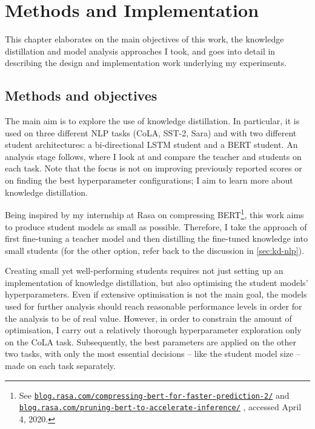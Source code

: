 \documentclass[bsc,frontabs,singlespacing,parskip,deptreport]{infthesis}
\newcommand\rurl[1]{%
  \href{https://#1}{\nolinkurl{#1}}%
}
\begin{document}
\chapter{Methods and Implementation}{
  \label{chap:methods-implementation}

  This chapter elaborates on the main objectives of this work, the knowledge distillation and model analysis approaches I took, and goes into detail in describing the design and implementation work underlying my experiments.

  \section{Methods and objectives}{
    \label{sec:methods}
    The main aim is to explore the use of knowledge distillation. In particular, it is used on three different NLP tasks (CoLA, SST-2, Sara) and with two different student architectures: a bi-directional LSTM student and a BERT student. An analysis stage follows, where I look at and compare the teacher and students on each task. 
    Note that the focus is not on improving previously reported scores or on finding the best hyperparameter configurations; I aim to learn more about knowledge distillation.

    Being inspired by my internship at Rasa on compressing BERT\footnote{See \rurl{blog.rasa.com/compressing-bert-for-faster-prediction-2/} and \rurl{blog.rasa.com/pruning-bert-to-accelerate-inference/}, accessed April 4, 2020.}, this work aims to produce student models as small as possible.
    Therefore, I take the approach of first fine-tuning a teacher model and then distilling the fine-tuned knowledge into small students (for the other option, refer back to the discussion in \autoref{sec:kd-nlp}).

    Creating small yet well-performing students requires not just setting up an implementation of knowledge distillation, but also optimising the student models' hyperparameters.
    Even if extensive optimisation is not the main goal, the models used for further analysis should reach reasonable performance levels in order for the analysis to be of real value.
    However, in order to constrain the amount of optimisation, I carry out a relatively thorough hyperparameter exploration only on the CoLA task. 
    Subsequently, the best parameters are applied on the other two tasks, with only the most essential decisions -- like the student model size -- made on each task separately.

}}
\end{document}

